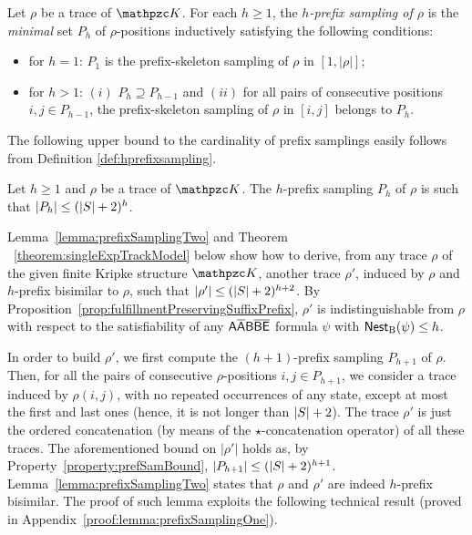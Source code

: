\begin{definition} \label{def:hprefixsampling}
 Let $\rho$ be a trace of $\Ku$. For each $h\geq 1$, the \emph{$h$-prefix sampling of $\rho$} is the \emph{minimal} set $P_h$ of $\rho$-positions inductively satisfying the following conditions:
\begin{itemize}
  \item for $h=1$: $P_1$ is the prefix-skeleton sampling of $\rho$ in $[1,|\rho|]$;
  \item for $h>1$:
  $(i)$  $P_h\supseteq P_{h-1}$ and
  $(ii)$ for all pairs of consecutive positions $i,j\in P_{h-1}$,
  the prefix-skeleton sampling of $\rho$ in $[i,j]$ belongs to $P_h$.
\end{itemize}
\end{definition}

The following upper bound to the cardinality of prefix samplings easily follows from Definition \ref{def:hprefixsampling}.

\begin{property}\label{property:prefSamBound}
Let $h\geq 1$ and $\rho$ be a trace of  $\Ku$. The $h$-prefix sampling $P_h$ of $\rho$ is such that $|P_h|\leq (|S|+2)^{h}$.
\end{property}

Lemma~\ref{lemma:prefixSamplingTwo} and Theorem ~\ref{theorem:singleExpTrackModel} below show how to derive, from any trace $\rho$ of the given finite Kripke structure $\Ku$, another trace $\rho'$, induced by $\rho$ and $h$-prefix  bisimilar to $\rho$, such that $|\rho'|\leq (|S|+2)^{h+2}$. By Proposition~\ref{prop:fulfillmentPreservingSuffixPrefix}, $\rho'$ is indistinguishable from $\rho$ with respect to the satisfiability of any $\mathsf{A\overline{A}B\overline{B}\overline{E}}$ formula $\psi$ with $\operatorname{\mathsf{Nest}_B}(\psi)\leq h$.

In order to build $\rho'$, we first compute the $(h+1)$-prefix sampling $P_{h+1}$ of $\rho$. Then, for all the pairs of consecutive $\rho$-positions $i,j\in P_{h+1}$, we consider a trace induced by $\rho(i,j)$, with no repeated occurrences of any state, except at most the first and last ones (hence, it is not longer than $|S|+2$). The trace $\rho'$ is just the ordered concatenation (by means of the $\star$-concatenation operator) of all these traces.
The aforementioned bound on $|\rho'|$ holds as, by Property~\ref{property:prefSamBound}, $|P_{h+1}|\leq (|S|+2)^{h+1}$.
Lemma~\ref{lemma:prefixSamplingTwo} states that $\rho$ and $\rho'$ are indeed $h$-prefix bisimilar.
The proof of such lemma exploits the following technical result (proved in Appendix~\ref{proof:lemma:prefixSamplingOne}).

